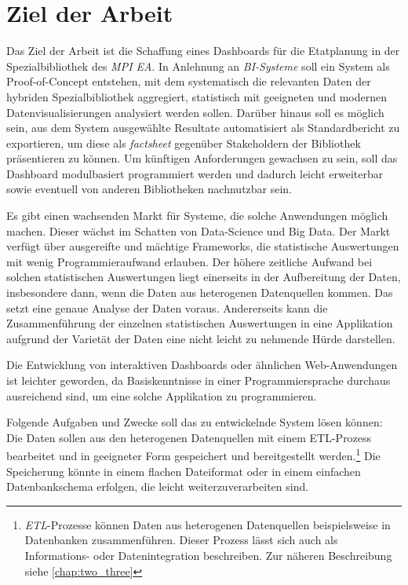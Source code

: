 \section{Ziel der Arbeit}
Das Ziel der Arbeit ist die Schaffung eines Dashboards für die Etatplanung in der Spezialbibliothek des \textit{\acrshort{MPI EA}}.
In Anlehnung an \textit{\acrshort{BI}-Systeme} soll ein System als Proof-of-Concept entstehen,
mit dem systematisch die relevanten Daten der hybriden Spezialbibliothek aggregiert, statistisch
mit geeigneten und modernen Datenvisualisierungen analysiert werden sollen.
Darüber hinaus soll es möglich sein, aus dem System ausgewählte
Resultate automatisiert als Standardbericht zu exportieren, um diese
als \textit{factsheet} gegenüber Stakeholdern der Bibliothek präsentieren zu können.
Um künftigen Anforderungen gewachsen zu sein, soll das Dashboard
modulbasiert programmiert werden und dadurch leicht erweiterbar sowie eventuell von
anderen Bibliotheken nachnutzbar sein.


Es gibt einen wachsenden Markt für Systeme, die solche Anwendungen möglich machen. Dieser wächst im Schatten von Data-Science und Big Data. 
Der Markt verfügt über ausgereifte und mächtige Frameworks, die statistische Auswertungen mit wenig Programmieraufwand erlauben. 
Der höhere zeitliche Aufwand bei solchen statistischen Auswertungen liegt  einerseits in der Aufbereitung der Daten, 
insbesondere dann, wenn die Daten aus heterogenen Datenquellen kommen. 
Das setzt eine genaue Analyse der Daten voraus. Andererseits kann die Zusammenführung der einzelnen statistischen Auswertungen in eine Applikation 
aufgrund der Varietät der Daten eine nicht leicht zu nehmende Hürde darstellen. 

Die Entwicklung von interaktiven Dashboards oder ähnlichen Web-Anwendungen ist leichter geworden, da
Basiskenntnisse in einer Programmiersprache durchaus ausreichend sind, um eine solche Applikation zu programmieren.

Folgende Aufgaben und Zwecke soll das zu entwickelnde System lösen können:
Die Daten sollen aus den heterogenen Datenquellen mit einem \acrfull{ETL}-Prozess bearbeitet und in
geeigneter Form gespeichert und bereitgestellt werden.\footnote{ \textit{\acrshort{ETL}}-Prozesse können Daten aus heterogenen Datenquellen
beispielsweise in Datenbanken zusammenführen. Dieser Prozess lässt sich auch als Informations- oder Datenintegration beschreiben. Zur näheren Beschreibung siehe \autoref{chap:two_three}}
Die Speicherung könnte in einem flachen Dateiformat oder in einem einfachen Datenbankschema erfolgen, die leicht
weiterzuverarbeiten sind. 

